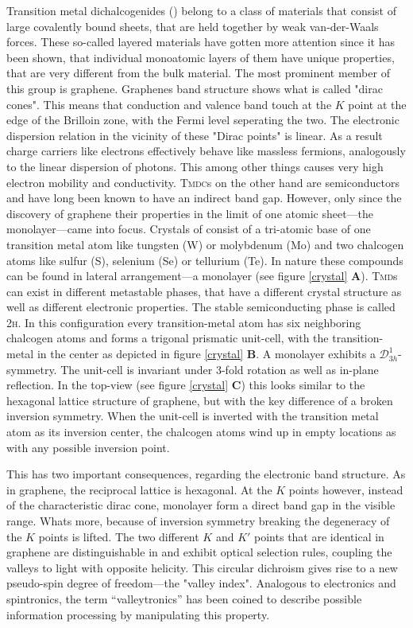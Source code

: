 Transition metal dichalcogenides (\tmds\!) belong to a class of materials that consist of large covalently bound sheets, that are held together by weak van-der-Waals forces. These so-called layered materials have gotten more attention since it has been shown, that individual monoatomic layers of them have unique properties, that are very different from the bulk material. The most prominent member of this group is graphene. Graphenes band structure shows what is called "dirac cones". This means that conduction and valence band touch at the $K$ point at the edge of the Brilloin zone, with the Fermi level seperating the two. The electronic dispersion relation in the vicinity of these "Dirac points" is linear. As a result charge carriers like electrons effectively behave like massless fermions, analogously to the linear dispersion of photons. This among other things causes very high electron mobility and conductivity. \textsc{Tmdc}s on the other hand are semiconductors and have long been known to have an indirect band gap. However, only since the discovery of graphene their properties in the limit of one atomic sheet---the monolayer---came into focus. Crystals of \tmds consist of a tri-atomic base of one transition metal atom like tungsten (W) or molybdenum (Mo) and two chalcogen atoms like sulfur (S), selenium (Se) or tellurium (Te). In nature these compounds can be found in lateral arrangement---a \tmdg monolayer (see figure \ref{crystal} \textbf{A}). \textsc{Tmd}s can exist in different metastable phases, that have a different crystal structure as well as different electronic properties\cite{ouyang_phase_2015}. The stable semiconducting phase is called 2\textsc{h}. In this configuration every transition-metal atom has six neighboring chalcogen atoms and forms a trigonal prismatic unit-cell, with the transition-metal in the center as depicted in figure \ref{crystal} \textbf{B}. A \tmdg monolayer exhibits a $\mathcal{D}^1_{3h}$-symmetry. The unit-cell is invariant under 3-fold rotation as well as in-plane reflection. In the top-view (see figure \ref{crystal} \textbf{C}) this looks similar to the hexagonal lattice structure of graphene, but with the key difference of a broken inversion symmetry. When the unit-cell is inverted with the transition metal atom as its inversion center, the chalcogen atoms wind up in empty locations as with any possible inversion point.

This has two important consequences, regarding the electronic band structure. As in graphene, the reciprocal lattice is hexagonal. At the $K$ points however, instead of the characteristic dirac cone, monolayer \tmds form a direct band gap in the visible range. Whats more, because of inversion symmetry breaking the degeneracy of the $K$ points is lifted. The two different $K$ and $K'$ points that are identical in graphene are distinguishable in \tmds and exhibit optical selection rules, coupling the valleys to light with opposite helicity. This circular dichroism gives rise to a new pseudo-spin degree of freedom---the "valley index". Analogous to electronics and spintronics, the term ``valleytronics'' has been coined to describe possible information processing by manipulating this property\cite{wang_electronics_2012, xiao_coupled_2012}. 

